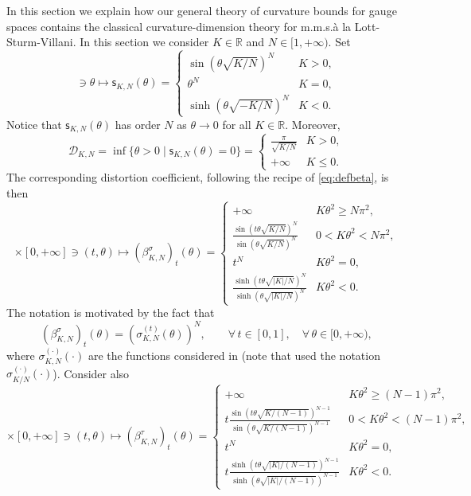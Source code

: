 \documentclass[11pt,a4paper]{article}
\theoremstyle{plain}
\theoremstyle{definition}
\theoremstyle{remark}
\numberwithin{equation}{section}
\newcommand{\R}{\mathbb{R}} %
\newcommand{\cD}{\mathcal{D}}
\newcommand{\sfs}{\mathsf{s}}
\begin{document}
In this section we explain how our general theory of curvature bounds for gauge spaces contains the classical curvature-dimension theory for m.m.s.\@ \`a la Lott-Sturm-Villani. In this section we consider $K\in \R$ and $N\in [1,+\infty)$. Set
\begin{equation}
[0,+\infty]\ni \theta \mapsto \sfs_{K,N}(\theta) = \begin{cases}   \sin\left(\theta \sqrt{K/N}\right)^{N} & K >0, \\
\theta^N & K =0, \\
   \sinh\left(\theta \sqrt{-K/N}\right)^{N} & K <0.
 \end{cases}
\end{equation}
Notice that $\sfs_{K,N}(\theta)$ has order $N$ as $\theta \to 0$ for all $K \in \R$. Moreover,
\begin{equation}
\cD_{K,N}=\inf\{\theta>0\mid \sfs_{K,N}(\theta)=0\}=\begin{cases}
\frac{\pi}{\sqrt{K/N}} & K >0, \\
+\infty & K \leq 0.
\end{cases}
\end{equation}
The corresponding distortion coefficient, following the recipe of \eqref{eq:defbeta}, is then
\begin{equation}
[0,1]\times [0,+\infty]\ni (t,\theta) \mapsto (\beta_{K,N}^{\sigma})_t(\theta) =
 \begin{cases}
+ \infty & K \theta^2 \geq N \pi^2, \\
 \frac{\sin\left(t\theta \sqrt{K/N}\right)^{N}}{\sin\left(\theta \sqrt{K/N}\right)^{N}} & 0<K\theta^2<N\pi^2, \\
t^N & K \theta^2 =0, \\
 \frac{\sinh\left(t\theta \sqrt{|K|/N}\right)^{N}}{\sinh\left(\theta \sqrt{|K|/N}\right)^{N}} & K\theta^2<0.
\end{cases}
\end{equation}
The notation is motivated by the fact that
\begin{equation}\label{eq:betaVssigma}
(\beta_{K,N}^{\sigma})_t(\theta) = \left(\sigma_{K,N}^{(t)}(\theta) \right)^N, \qquad \forall\, t\in [0,1],\quad \forall\, \theta \in [0,+\infty),
\end{equation}
where $\sigma_{K,N}^{(\cdot)}(\cdot)$ are the functions considered in \cite{BS10, EKS} (note that \cite{EKS} used the notation $\sigma_{K/N}^{(\cdot)}(\cdot)$). Consider also 
\begin{equation}
[0,1]\times [0,+\infty]\ni (t,\theta) \mapsto (\beta_{K,N}^{\tau})_t(\theta) =
 \begin{cases}
+ \infty & K\theta^2 \geq (N-1)\pi^2, \\
t \frac{\sin\left(t\theta \sqrt{K/(N-1)}\right)^{N-1}}{\sin\left(\theta \sqrt{K/(N-1)}\right)^{N-1}} & 0<K\theta^2<(N-1)\pi^2, \\
t^N & K\theta^2 =0, \\
t \frac{\sinh\left(t\theta \sqrt{|K|/(N-1)}\right)^{N-1}}{\sinh\left(\theta \sqrt{|K|/(N-1)}\right)^{N-1}} & K\theta^2<0.
\end{cases}
\end{equation}
\end{document}
